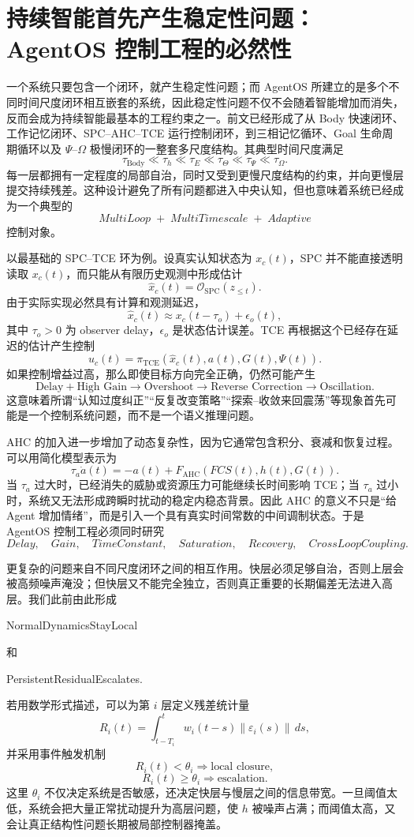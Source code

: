 \section{持续智能首先产生稳定性问题：AgentOS 控制工程的必然性}

一个系统只要包含一个闭环，就产生稳定性问题；而 AgentOS 所建立的是多个不同时间尺度闭环相互嵌套的系统，因此稳定性问题不仅不会随着智能增加而消失，反而会成为持续智能最基本的工程约束之一。前文已经形成了从 Body 快速闭环、工作记忆闭环、SPC--AHC--TCE 运行控制闭环，到三相记忆循环、Goal 生命周期循环以及 $\Psi$--$\Omega$ 极慢闭环的一整套多尺度结构。其典型时间尺度满足
\[
\tau_{\mathrm{Body}}
\ll
\tau_{h}
\ll
\tau_{E}
\ll
\tau_{\Theta}
\ll
\tau_{\Psi}
\ll
\tau_{\Omega}.
\]
每一层都拥有一定程度的局部自治，同时又受到更慢尺度结构的约束，并向更慢层提交持续残差。这种设计避免了所有问题都进入中央认知，但也意味着系统已经成为一个典型的
\[
\boxed{
MultiLoop\;+\;MultiTimescale\;+\;Adaptive
}
\]
控制对象。

以最基础的 SPC--TCE 环为例。设真实认知状态为 $x_c(t)$，SPC 并不能直接透明读取 $x_c(t)$，而只能从有限历史观测中形成估计
\[
\hat{x}_c(t)
=
\mathcal O_{\mathrm{SPC}}
\left(
z_{\leq t}
\right).
\]
由于实际实现必然具有计算和观测延迟，
\[
\hat{x}_c(t)
\approx
x_c(t-\tau_o)+\epsilon_o(t),
\]
其中 $\tau_o>0$ 为 observer delay，$\epsilon_o$ 是状态估计误差。TCE 再根据这个已经存在延迟的估计产生控制
\[
u_c(t)
=
\pi_{\mathrm{TCE}}
\left(
\hat{x}_c(t),
a(t),
G(t),
\Psi(t)
\right).
\]
如果控制增益过高，那么即使目标方向完全正确，仍然可能产生
\[
\text{Delay}
+
\text{High Gain}
\rightarrow
\text{Overshoot}
\rightarrow
\text{Reverse Correction}
\rightarrow
\text{Oscillation}.
\]
这意味着所谓“认知过度纠正”“反复改变策略”“探索--收敛来回震荡”等现象首先可能是一个控制系统问题，而不是一个语义推理问题。

AHC 的加入进一步增加了动态复杂性，因为它通常包含积分、衰减和恢复过程。可以用简化模型表示为
\[
\tau_a\dot a(t)
=
-a(t)
+
F_{\mathrm{AHC}}
\left(
FCS(t),h(t),G(t)
\right).
\]
当 $\tau_a$ 过大时，已经消失的威胁或资源压力可能继续长时间影响 TCE；当 $\tau_a$ 过小时，系统又无法形成跨瞬时扰动的稳定内稳态背景。因此 AHC 的意义不只是``给 Agent 增加情绪''，而是引入一个具有真实时间常数的中间调制状态。于是 AgentOS 控制工程必须同时研究
\[
Delay,\quad
Gain,\quad
TimeConstant,\quad
Saturation,\quad
Recovery,\quad
CrossLoopCoupling.
\]

更复杂的问题来自不同尺度闭环之间的相互作用。快层必须足够自治，否则上层会被高频噪声淹没；但快层又不能完全独立，否则真正重要的长期偏差无法进入高层。我们此前由此形成
\begin{statementbox}
NormalDynamicsStayLocal
\end{statementbox}
和
\begin{statementbox}
PersistentResidualEscalates.
\end{statementbox}
若用数学形式描述，可以为第 $i$ 层定义残差统计量
\[
R_i(t)
=
\int_{t-T_i}^{t}
w_i(t-s)
\left\|
\varepsilon_i(s)
\right\|
\,ds,
\]
并采用事件触发机制
\[
R_i(t)<\theta_i
\Rightarrow
\text{local closure},
\]
\[
R_i(t)\geq\theta_i
\Rightarrow
\text{escalation}.
\]
这里 $\theta_i$ 不仅决定系统是否敏感，还决定快层与慢层之间的信息带宽。一旦阈值太低，系统会把大量正常扰动提升为高层问题，使 $h$ 被噪声占满；而阈值太高，又会让真正结构性问题长期被局部控制器掩盖。

